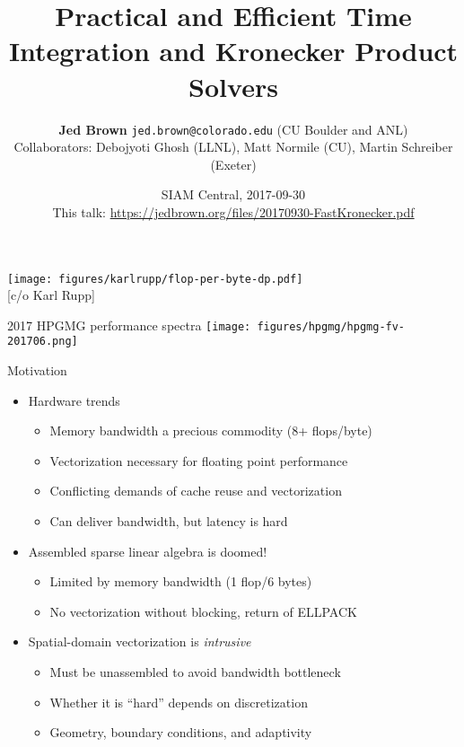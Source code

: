 \documentclass{beamer}
\title{Practical and Efficient Time Integration and Kronecker Product Solvers}
\author{{\bf Jed Brown} \texttt{jed.brown@colorado.edu} (CU Boulder and ANL) \\
  Collaborators: Debojyoti Ghosh (LLNL), Matt Normile (CU), Martin Schreiber (Exeter)}
\date{SIAM Central, 2017-09-30 \\
This talk: \url{https://jedbrown.org/files/20170930-FastKronecker.pdf}}
\begin{document}
\lstset{language=C}
\normalem

\begin{frame}
  \titlepage
\end{frame}

\begin{frame}
  \texttt{[image: figures/karlrupp/flop-per-byte-dp.pdf]} \\
  {\scriptsize [c/o Karl Rupp]}
\end{frame}

\begin{frame}{2017 HPGMG performance spectra}
  \texttt{[image: figures/hpgmg/hpgmg-fv-201706.png]} \\
\end{frame}

\begin{frame}{Motivation}
  \begin{itemize}
  \item Hardware trends
    \begin{itemize}
    \item Memory bandwidth a precious commodity (8+ flops/byte)
    \item Vectorization necessary for floating point performance
    \item Conflicting demands of cache reuse and vectorization
    \item Can deliver bandwidth, but latency is hard
    \end{itemize}
  \item Assembled sparse linear algebra is doomed!
    \begin{itemize}
    \item Limited by memory bandwidth (1 flop/6 bytes)
    \item No vectorization without blocking, return of ELLPACK
    \end{itemize}
  \item Spatial-domain vectorization is \emph{intrusive}
    \begin{itemize}
    \item Must be unassembled to avoid bandwidth bottleneck
    \item Whether it is ``hard'' depends on discretization
    \item Geometry, boundary conditions, and adaptivity
    \end{itemize}
  \end{itemize}
\end{frame}
\end{document}
